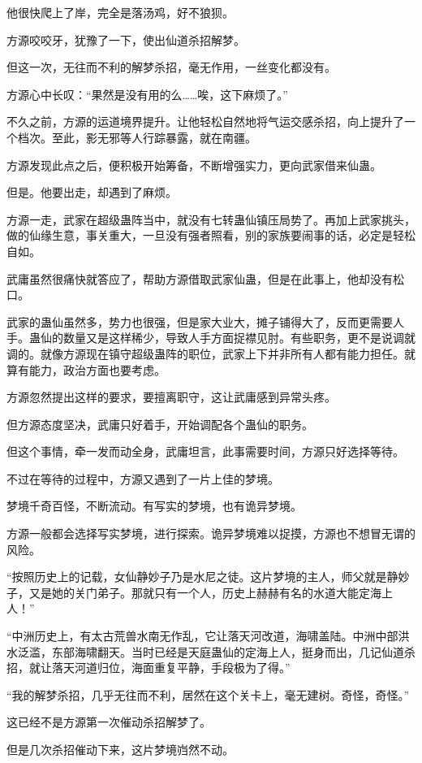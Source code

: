 \begin{this_body}
他很快爬上了岸，完全是落汤鸡，好不狼狈。

方源咬咬牙，犹豫了一下，使出仙道杀招解梦。

但这一次，无往而不利的解梦杀招，毫无作用，一丝变化都没有。

方源心中长叹：“果然是没有用的么……唉，这下麻烦了。”

不久之前，方源的运道境界提升。让他轻松自然地将气运交感杀招，向上提升了一个档次。至此，影无邪等人行踪暴露，就在南疆。

方源发现此点之后，便积极开始筹备，不断增强实力，更向武家借来仙蛊。

但是。他要出走，却遇到了麻烦。

方源一走，武家在超级蛊阵当中，就没有七转蛊仙镇压局势了。再加上武家挑头，做的仙缘生意，事关重大，一旦没有强者照看，别的家族要闹事的话，必定是轻松自如。

武庸虽然很痛快就答应了，帮助方源借取武家仙蛊，但是在此事上，他却没有松口。

武家的蛊仙虽然多，势力也很强，但是家大业大，摊子铺得大了，反而更需要人手。蛊仙的数量又是这样稀少，导致人手方面捉襟见肘。有些职务，更不是说调就调的。就像方源现在镇守超级蛊阵的职位，武家上下并非所有人都有能力担任。就算有能力，政治方面也要考虑。

方源忽然提出这样的要求，要擅离职守，这让武庸感到异常头疼。

但方源态度坚决，武庸只好着手，开始调配各个蛊仙的职务。

但这个事情，牵一发而动全身，武庸坦言，此事需要时间，方源只好选择等待。

不过在等待的过程中，方源又遇到了一片上佳的梦境。

梦境千奇百怪，不断流动。有写实的梦境，也有诡异梦境。

方源一般都会选择写实梦境，进行探索。诡异梦境难以捉摸，方源也不想冒无谓的风险。

“按照历史上的记载，女仙静妙子乃是水尼之徒。这片梦境的主人，师父就是静妙子，又是她的关门弟子。那就只有一个人，历史上赫赫有名的水道大能定海上人！”

“中洲历史上，有太古荒兽水南无作乱，它让落天河改道，海啸盖陆。中洲中部洪水泛滥，东部海啸翻天。当时已经是天庭蛊仙的定海上人，挺身而出，几记仙道杀招，就让落天河道归位，海面重复平静，手段极为了得。”

“我的解梦杀招，几乎无往而不利，居然在这个关卡上，毫无建树。奇怪，奇怪。”

这已经不是方源第一次催动杀招解梦了。

但是几次杀招催动下来，这片梦境岿然不动。


\end{this_body}
